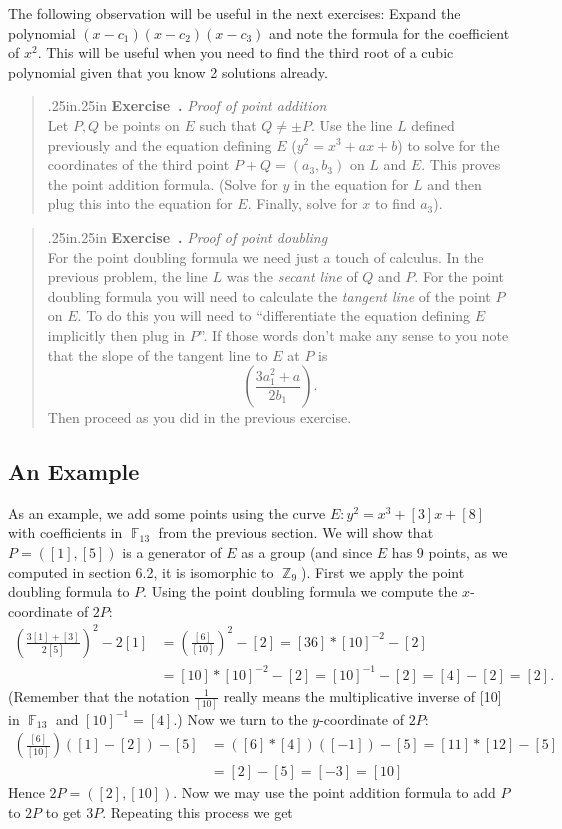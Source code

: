 \documentclass[12 pt]{article}
\DeclareMathOperator{\Z}{\mathbb{Z}}
\DeclareMathOperator{\F}{\mathbb{F}}
\newcounter{exercise}[section]
\newenvironment{exercise}{\refstepcounter{exercise}\par\bigskip \begin{quotation}{}{\leftmargin .25in\rightmargin .25in}
	\noindent \textbf{Exercise~\thesection.\theexercise }  \rmfamily}{\end{quotation}\par\bigskip}
\begin{document}
The following observation will be useful in the next exercises: Expand the polynomial $(x-c_1)(x-c_2)(x-c_3)$ and note the formula for the coefficient of $x^2$. This will be useful when you need to find the third root of a cubic polynomial given that you know 2 solutions already.

\begin{exercise}\emph{Proof of point addition} \\ 
Let $P,Q$ be points on $E$ such that $Q\not=\pm P$. Use the line $L$ defined previously and the equation defining $E$ ($y^2=x^3+ax+b$) to solve for the coordinates of the third point $P+Q=(a_3,b_3)$ on $L$ and $E$. This proves the point addition formula. (Solve for $y$ in the equation for $L$ and then plug this into the equation for $E$. Finally, solve for $x$ to find $a_3$).
\end{exercise}

\begin{exercise}\emph{Proof of point doubling}\\
For the point doubling formula we need just a touch of calculus. In the previous problem, the line $L$ was the \emph{secant line} of $Q$ and $P$. For the point doubling formula you will need to calculate the \emph{tangent line} of the point $P$ on $E$. To do this you will need to ``differentiate the equation defining $E$ implicitly then plug in $P$''. If those words don't make any sense to you note that the slope of the tangent line to $E$ at $P$ is
\[
\left(\frac{3a_1^2+a}{2b_1}\right).
\]
Then proceed as you did in the previous exercise.
\end{exercise}

\subsection{An Example}
As an example, we add some points using the curve $E: y^2=x^3+[3]x+[8]$ with coefficients in $\F_{13}$ from the previous section. We will show that $P=([1],[5])$ is a generator of $E$ as a group (and since $E$ has 9 points, as we computed in section 6.2, it is isomorphic to $\Z_9$). First we apply the point doubling formula to $P$. Using the point doubling formula we compute the $x$-coordinate of $2P$:
\begin{align*}
\left(\frac{3[1]+[3]}{2[5]}\right)^2-2[1] &= \left(\frac{[6]}{[10]}\right)^2-[2]=[36]*[10]^{-2}-[2] \\
&=[10]*[10]^{-2}-[2]=[10]^{-1}-[2]=[4]-[2]=[2].
\end{align*}
(Remember that the notation $\frac{1}{[10]}$ really means the multiplicative inverse of [10] in $\F_{13}$ and  $[10]^{-1}=[4]$.) Now we turn to the $y$-coordinate of $2P$:
\begin{align*}
\left(\frac{[6]}{[10]}\right)([1]-[2])-[5] &= ([6]*[4])([-1])-[5]=[11]*[12]-[5] \\
&=[2]-[5]=[-3] =[10]
\end{align*}
Hence $2P=([2],[10])$. Now we may use the point addition formula to add $P$ to $2P$ to get $3P$. Repeating this process we get
\end{document}
